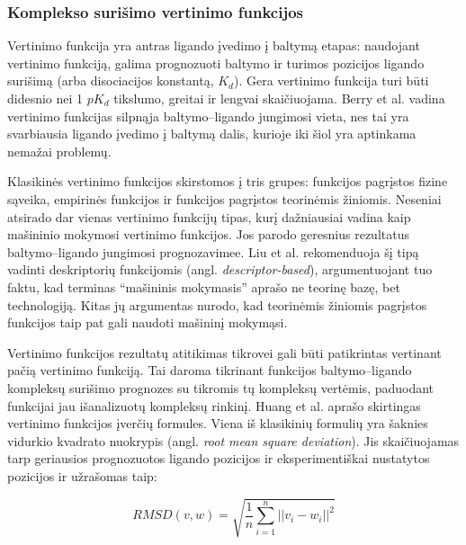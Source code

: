 
\subsubsection{Komplekso surišimo vertinimo funkcijos}

Vertinimo funkcija yra antras ligando įvedimo į baltymą etapas: naudojant vertinimo funkciją, galima prognozuoti baltymo ir turimos pozicijos ligando surišimą (arba disociacijos konstantą, $K_{d}$). Gera vertinimo funkcija turi būti didesnio nei 1 $pK_{d}$ tikslumo, greitai ir lengvai skaičiuojama. Berry et al.\cite{berry_practical_2015} vadina vertinimo funkcijas silpnąja baltymo--ligando jungimosi vieta, nes tai yra svarbiausia ligando įvedimo į baltymą dalis, kurioje iki šiol yra aptinkama nemažai problemų. 

Klasikinės vertinimo funkcijos skirstomos į tris grupes: funkcijos pagrįstos fizine sąveika, empirinės funkcijos ir funkcijos pagrįstos teorinėmis žiniomis.\cite{liu_classification_2015} Neseniai atsirado dar vienas vertinimo funkcijų tipas, kurį dažniausiai vadina kaip mašininio mokymosi vertinimo funkcijos. Jos parodo geresnius rezultatus baltymo--ligando jungimosi prognozavimee.\cite{wojcikowski_performance_2017} Liu et al.\cite{liu_classification_2015} rekomenduoja šį tipą vadinti deskriptorių funkcijomis (angl. \textit{descriptor-based}), argumentuojant tuo faktu, kad terminas \enquote{mašininis mokymasis} aprašo ne teorinę bazę, bet technologiją. Kitas jų argumentas nurodo, kad teorinėmis žiniomis pagrįstos funkcijos taip pat gali naudoti mašininį mokymąsi. 

Vertinimo funkcijos rezultatų atitikimas tikrovei gali būti patikrintas vertinant pačią vertinimo funkciją. Tai daroma tikrinant funkcijos baltymo--ligando kompleksų surišimo prognozes su tikromis tų kompleksų vertėmis, paduodant funkcijai jau išanalizuotų kompleksų rinkinį. Huang et al.\cite{huang_scoring_2010} aprašo skirtingas vertinimo funkcijos įverčių formules. Viena iš klasikinių formulių yra šaknies vidurkio kvadrato nuokrypis (angl. \textit{root mean square deviation}). Jis skaičiuojamas tarp geriausios prognozuotos ligando pozicijos ir eksperimentiškai nustatytos pozicijos ir užrašomas taip:

\begin{equation}
RMSD(v, w) = \sqrt{\frac{1}{n} \sum_{i=1}^{n} {|| v_i - w_i ||}^2}
\end{equation}


